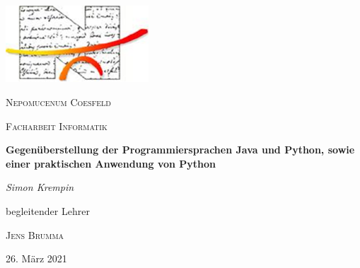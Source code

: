 \begin{titlepage}
	\centering
	\includegraphics[width=0.4\textwidth]{images/logo.png}\par\vspace{1cm}
	{\scshape\LARGE Nepomucenum Coesfeld \par}
	\vspace{1cm}
	{\scshape\Large Facharbeit Informatik\par}
	\vspace{1.5cm}
	{\huge\bfseries Gegenüberstellung der Programmiersprachen Java und Python, sowie einer praktischen Anwendung von Python\par}
	\vspace{2cm}
	{\Large\itshape Simon Krempin\par}
	\vfill
	begleitender Lehrer\par
	\textsc{Jens Brumma}

	\vfill

	{\large 26. März 2021\par}
\end{titlepage}
\clearpage
\tableofcontents
{}
\clearpage

